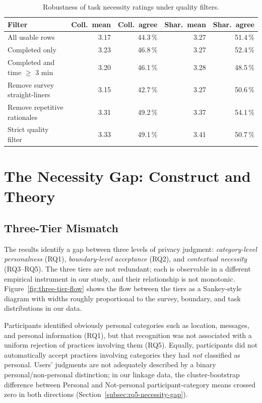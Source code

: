 \documentclass[11pt,a4paper]{article}
\makeatletter
\let\@oldsection\section
\renewcommand{\section}{\FloatBarrier\@oldsection}
\makeatother
\begin{document}


\begin{table}[t]
\centering
\caption{Robustness of task necessity ratings under quality filters.}
\label{tab:robustness}
\small
\begin{tabular}{lrrrr}
\toprule
\textbf{Filter} & \textbf{Coll.\ mean} & \textbf{Coll.\ agree}
                & \textbf{Shar.\ mean} & \textbf{Shar.\ agree} \\
\midrule
All usable rows                   & 3.17 & 44.3\,\% & 3.27 & 51.4\,\% \\
Completed only                    & 3.23 & 46.8\,\% & 3.27 & 52.4\,\% \\
Completed and time $\geq$ 3 min   & 3.20 & 46.1\,\% & 3.28 & 48.5\,\% \\
Remove survey straight-liners     & 3.15 & 42.7\,\% & 3.27 & 50.6\,\% \\
Remove repetitive rationales      & 3.31 & 49.2\,\% & 3.37 & 54.1\,\% \\
Strict quality filter             & 3.33 & 49.1\,\% & 3.41 & 50.7\,\% \\
\bottomrule
\end{tabular}
\end{table}

\section{The Necessity Gap: Construct and Theory}
\label{sec:necessity-gap}

\subsection{Three-Tier Mismatch}
\label{subsec:three-tier}

The results identify a gap between three levels of privacy judgment:
\emph{category-level personalness} (RQ1), \emph{boundary-level
acceptance} (RQ2), and \emph{contextual necessity} (RQ3--RQ5). The
three tiers are not redundant; each is observable in a different
empirical instrument in our study, and their relationship is not
monotonic. Figure~\ref{fig:three-tier-flow} shows the flow between the
tiers as a Sankey-style diagram with widths roughly proportional to
the survey, boundary, and task distributions in our data.



Participants identified obviously personal categories such as location,
messages, and personal information (RQ1), but that recognition was not
associated with a uniform rejection of practices involving them (RQ5).
Equally, participants did not automatically accept practices involving
categories they had \emph{not} classified as personal. Users' judgments
are not adequately described by a binary personal/non-personal
distinction; in our linkage data, the cluster-bootstrap difference
between Personal and Not-personal participant-category means crossed
zero in both directions (Section~\ref{subsec:rq5-necessity-gap}).
\end{document}
